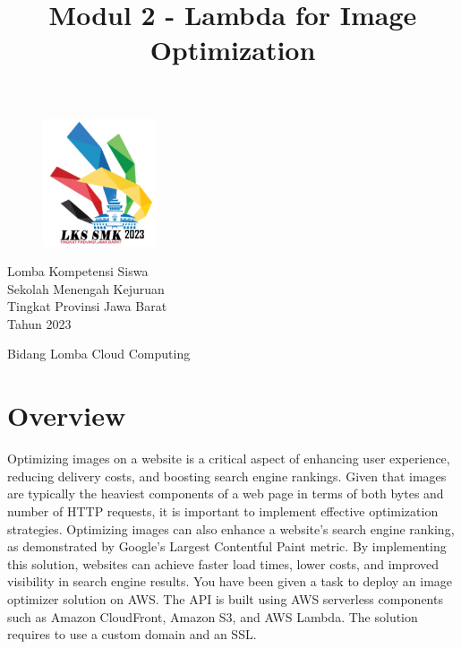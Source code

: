 \documentclass{article}
\title{Modul 2 - Lambda for Image Optimization}
\author{}
\begin{document}
\lstset{language=Bash,upquote=true}
\begin{figure}[h]
\centering
\includegraphics[width=0.3\textwidth]{logo_lks_2023.jpg}
\end{figure}
\centering
{\huge
Lomba Kompetensi Siswa\\
Sekolah Menengah Kejuruan\\
Tingkat Provinsi Jawa Barat\\
Tahun 2023\\
\vspace{10mm} %
}
\vspace{30mm} %
{\let\newpage\relax\maketitle}
\vspace{30mm} %
{\LARGE Bidang Lomba Cloud Computing}

\raggedright
\newpage

\section{Overview}
Optimizing images on a website is a critical aspect of enhancing user experience, reducing delivery costs, and boosting search engine rankings.
Given that images are typically the heaviest components of a web page in terms of both bytes and number of HTTP requests, it is important to implement effective optimization strategies.
Optimizing images can also enhance a website's search engine ranking, as demonstrated by Google's Largest Contentful Paint metric.
By implementing this solution, websites can achieve faster load times, lower costs, and improved visibility in search engine results.
You have been given a task to deploy an image optimizer solution on AWS. The API is built using AWS serverless components such as Amazon CloudFront, Amazon S3, and AWS Lambda. The solution requires to use a custom domain and an SSL.
\end{document}

